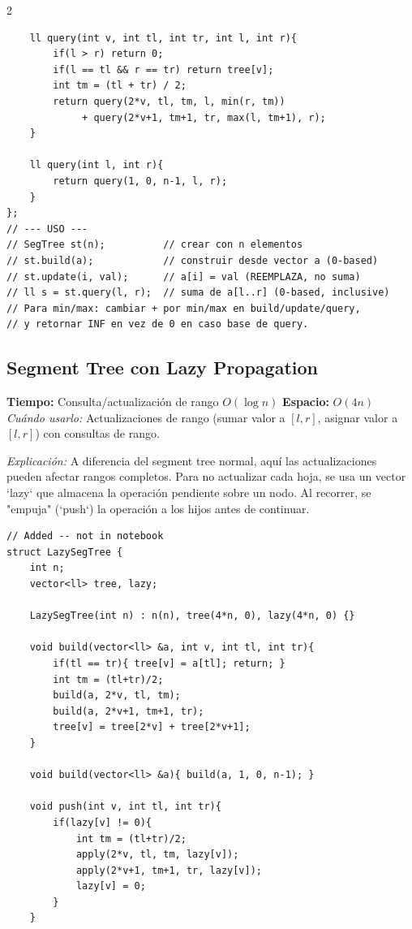 \documentclass[10pt,a4paper]{article}
\begin{document}
\begin{multicols}{2}
\begin{lstlisting}
    ll query(int v, int tl, int tr, int l, int r){
        if(l > r) return 0;
        if(l == tl && r == tr) return tree[v];
        int tm = (tl + tr) / 2;
        return query(2*v, tl, tm, l, min(r, tm))
             + query(2*v+1, tm+1, tr, max(l, tm+1), r);
    }

    ll query(int l, int r){
        return query(1, 0, n-1, l, r);
    }
};
// --- USO ---
// SegTree st(n);          // crear con n elementos
// st.build(a);            // construir desde vector a (0-based)
// st.update(i, val);      // a[i] = val (REEMPLAZA, no suma)
// ll s = st.query(l, r);  // suma de a[l..r] (0-based, inclusive)
// Para min/max: cambiar + por min/max en build/update/query,
// y retornar INF en vez de 0 en caso base de query.
\end{lstlisting}

\subsection{Segment Tree con Lazy Propagation}
\textbf{Tiempo:} Consulta/actualizaci\'on de rango $O(\log n)$ \quad \textbf{Espacio:} $O(4n)$\\
\textit{Cu\'ando usarlo:} Actualizaciones de rango (sumar valor a $[l,r]$, asignar valor a $[l,r]$) con consultas de rango.

\textit{Explicación:} A diferencia del segment tree normal, aquí las actualizaciones pueden afectar rangos completos. Para no actualizar cada hoja, se usa un vector `lazy` que almacena la operación pendiente sobre un nodo. Al recorrer, se "empuja" (`push`) la operación a los hijos antes de continuar.

\begin{lstlisting}
// Added -- not in notebook
struct LazySegTree {
    int n;
    vector<ll> tree, lazy;

    LazySegTree(int n) : n(n), tree(4*n, 0), lazy(4*n, 0) {}

    void build(vector<ll> &a, int v, int tl, int tr){
        if(tl == tr){ tree[v] = a[tl]; return; }
        int tm = (tl+tr)/2;
        build(a, 2*v, tl, tm);
        build(a, 2*v+1, tm+1, tr);
        tree[v] = tree[2*v] + tree[2*v+1];
    }

    void build(vector<ll> &a){ build(a, 1, 0, n-1); }

    void push(int v, int tl, int tr){
        if(lazy[v] != 0){
            int tm = (tl+tr)/2;
            apply(2*v, tl, tm, lazy[v]);
            apply(2*v+1, tm+1, tr, lazy[v]);
            lazy[v] = 0;
        }
    }


\end{lstlisting}
\end{multicols}
\end{document}
